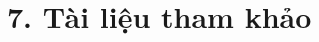 \documentclass[../main.tex]{subfiles}
\begin{document}
\section{7. Tài liệu tham khảo}

\end{document}
